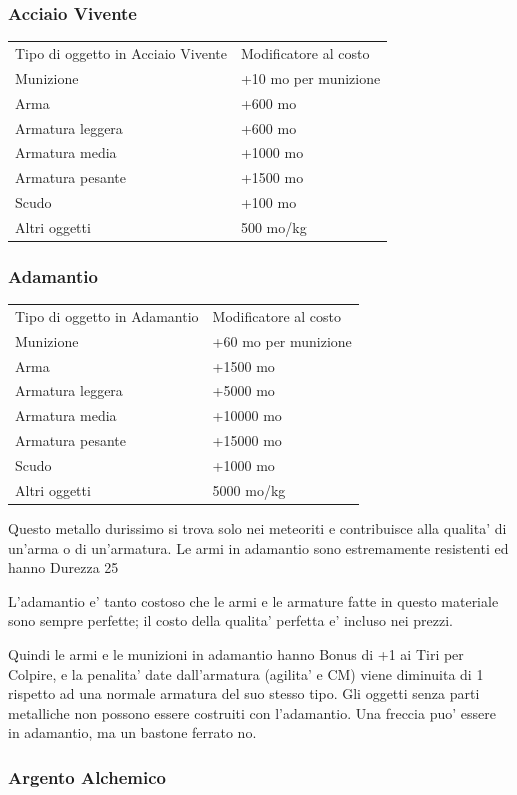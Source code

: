 \documentclass[a4paper,11pt,twoside,openany]{dndbook}
\begin{document}
{\subsubsection{Acciaio Vivente}

\label{acciaio-vivente}

\begin{tabular}[c]{@{}ll@{}}
\toprule 
Tipo di oggetto in Acciaio Vivente & Modificatore al costo\tabularnewline
Munizione & +10 mo per munizione\tabularnewline
Arma & +600 mo\tabularnewline
Armatura leggera & +600 mo\tabularnewline
Armatura media & +1000 mo\tabularnewline
Armatura pesante & +1500 mo\tabularnewline
Scudo & +100 mo\tabularnewline
Altri oggetti & 500 mo/kg\tabularnewline
\bottomrule
\end{tabular}

\subsubsection{Adamantio}

\label{adamantio}

\begin{tabular}[c]{@{}ll@{}}
\toprule 
Tipo di oggetto in Adamantio & Modificatore al costo\tabularnewline
Munizione & +60 mo per munizione\tabularnewline
Arma & +1500 mo\tabularnewline
Armatura leggera & +5000 mo\tabularnewline
Armatura media & +10000 mo\tabularnewline
Armatura pesante & +15000 mo\tabularnewline
Scudo & +1000 mo\tabularnewline
Altri oggetti & 5000 mo/kg\tabularnewline
\bottomrule
\end{tabular}

Questo metallo durissimo si trova solo nei meteoriti e contribuisce alla qualita' di un'arma o di un'armatura. Le armi in adamantio sono estremamente resistenti ed hanno Durezza 25

L'adamantio e' tanto costoso che le armi e le armature fatte in questo materiale sono sempre perfette; il costo della qualita' perfetta e' incluso nei prezzi.

Quindi le armi e le munizioni in adamantio hanno Bonus di +1 ai Tiri per Colpire, e la penalita' date dall'armatura (agilita' e CM) viene diminuita di 1 rispetto ad una normale armatura del suo stesso tipo. Gli oggetti senza parti metalliche non possono essere costruiti con l'adamantio. Una freccia puo' essere in adamantio, ma un bastone ferrato
no.

\subsubsection{Argento Alchemico}

}
\end{document}
